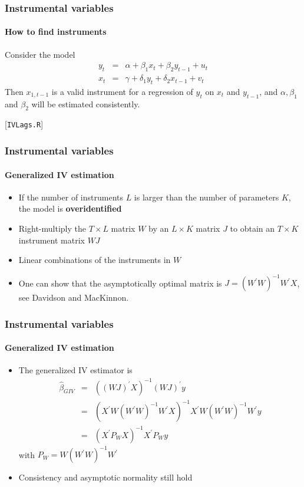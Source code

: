 \documentclass[notes=show]{beamer}
\begin{document}
\begin{frame}\frametitle{Instrumental variables}\framesubtitle{How to find instruments}
\begin{example}
    Consider the model
    \begin{eqnarray*}
        y_{t} &=&\alpha +\beta _{1}x_{t}+\beta _{2}y_{t-1}+u_{t} \\
        x_{t} &=&\gamma +\delta _{1}y_{t}+\delta _{2}x_{t-1}+v_{t}
    \end{eqnarray*}%
    Then $x_{1,t-1}$ is a valid instrument for a regression of $y_{t}$ on $x_{t}$ and $y_{t-1}$, and $\alpha ,\beta _{1}$ and $\beta _{2}$ will be estimated consistently.
\end{example}
\hfill [\texttt{IVLags.R}]
\end{frame}


\begin{frame}\frametitle{Instrumental variables}\framesubtitle{Generalized IV estimation}
\begin{itemize}
    \item If the number of instruments $L$ is larger than the number of parameters $K$, the model is \textbf{overidentified}
    \item Right-multiply the $T\times L$ matrix $W$ by an $L\times K$ matrix $J$ to obtain an $T\times K$ instrument matrix $WJ$
    \item Linear combinations of the instruments in $W$
    \item One can show that the asymptotically optimal matrix is $J=\left(W^{\prime }W\right) ^{-1}W^{\prime }X$, see Davidson and MacKinnon.
\end{itemize}
\end{frame}


\begin{frame}\frametitle{Instrumental variables}\framesubtitle{Generalized IV estimation}
\begin{itemize}
    \item The generalized IV estimator is%
    \begin{eqnarray*}
        \hat{\beta}_{GIV} &=&\left( \left( WJ\right) ^{\prime }X\right) ^{-1}\left(WJ\right) ^{\prime }y \\
        &=&\left( X^{\prime }W\left( W^{\prime }W\right) ^{-1}W^{\prime }X\right)^{-1}X^{\prime }W\left( W^{\prime }W\right) ^{-1}W^{\prime }y \\
        &=&\left( X^{\prime }P_{W}X\right) ^{-1}X^{\prime }P_{W}y
    \end{eqnarray*}
    with $P_{W}=W\left( W^{\prime }W\right) ^{-1}W^{\prime }$
    \item Consistency and asymptotic normality still hold
\end{itemize}
\end{frame}
\end{document}
